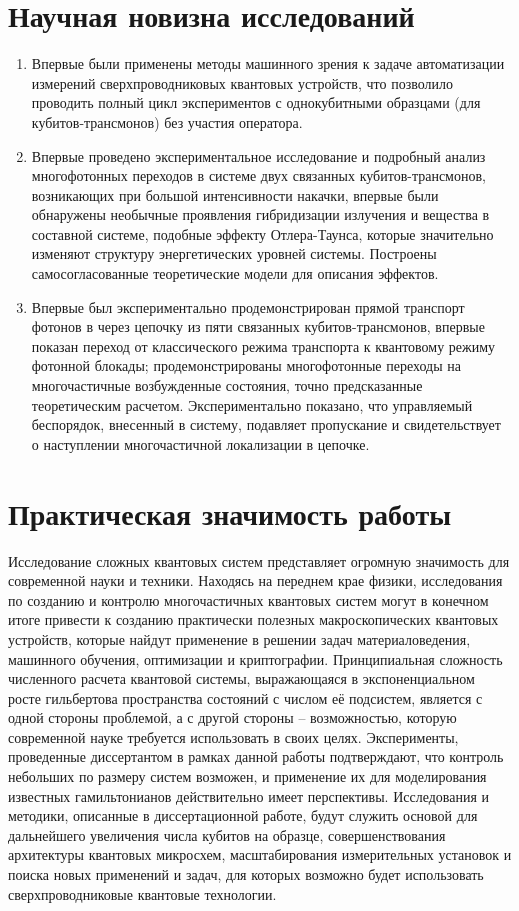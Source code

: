 \documentclass[14pt, a4paper]{extreport}
\numberwithin{equation}{section}
\begin{document}
\section*{Научная новизна исследований}

\begin{enumerate}
	\item Впервые были применены методы машинного зрения к задаче автоматизации измерений сверхпроводниковых квантовых устройств, что позволило проводить полный цикл экспериментов с однокубитными образцами (для кубитов\hyp трансмонов) без участия оператора.
	\item Впервые проведено экспериментальное исследование и  подробный анализ многофотонных переходов в системе двух связанных кубитов\hyp трансмонов, возникающих при большой интенсивности накачки, впервые были обнаружены необычные проявления гибридизации излучения и вещества в составной системе, подобные эффекту Отлера\hyp Таунса, которые значительно изменяют структуру энергетических уровней системы. Построены самосогласованные теоретические модели для описания эффектов.
	\item Впервые был экспериментально продемонстрирован прямой транспорт фотонов в через цепочку из пяти связанных кубитов\hyp трансмонов, впервые показан переход от классического режима транспорта к квантовому режиму фотонной блокады; продемонстрированы многофотонные переходы на многочастичные возбужденные состояния, точно предсказанные теоретическим расчетом. Экспериментально показано, что управляемый беспорядок, внесенный в систему, подавляет пропускание и свидетельствует о наступлении многочастичной локализации в цепочке.
\end{enumerate}

\section*{Практическая значимость работы}

Исследование сложных квантовых систем представляет огромную значимость для современной науки и техники. Находясь на переднем крае физики, исследования по созданию и контролю многочастичных квантовых систем могут в конечном итоге привести к созданию практически полезных макроскопических квантовых устройств, которые найдут применение в решении задач материаловедения, машинного обучения, оптимизации и криптографии. Принципиальная сложность численного расчета квантовой системы, выражающаяся в экспоненциальном росте гильбертова пространства состояний с числом её подсистем, является с одной стороны проблемой, а с другой стороны -- возможностью, которую современной науке требуется использовать в своих целях. Эксперименты, проведенные диссертантом в рамках данной работы подтверждают, что контроль небольших по размеру систем возможен, и применение их для моделирования известных гамильтонианов действительно имеет перспективы. Исследования и методики, описанные в диссертационной работе, будут служить основой для дальнейшего увеличения числа кубитов на образце, совершенствования архитектуры квантовых микросхем, масштабирования измерительных установок и поиска новых применений и задач, для которых возможно будет использовать сверхпроводниковые квантовые технологии.
\end{document}
